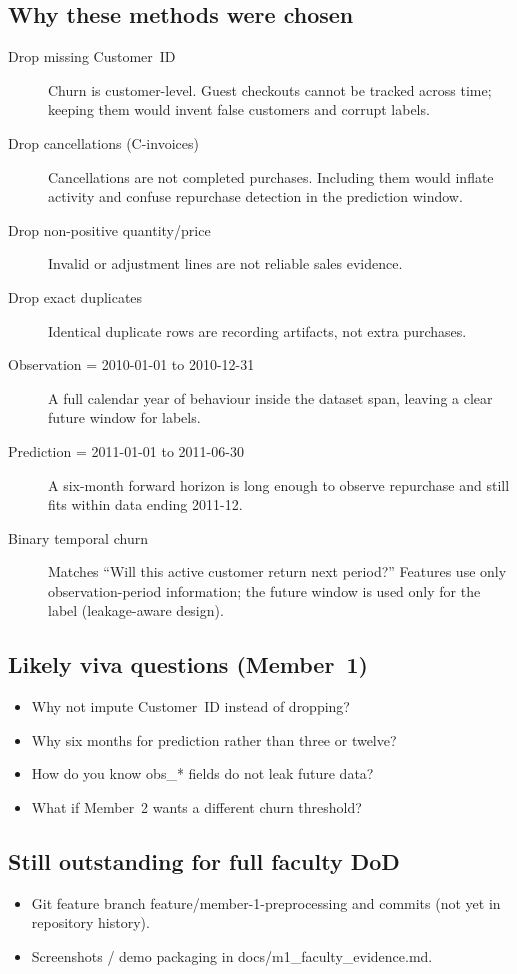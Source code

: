 \documentclass[11pt,a4paper]{article}
\renewcommand{\texttt}[1]{#1}
\begin{document}
\subsection{Why these methods were chosen}
\begin{description}
  \item[Drop missing Customer~ID]
        Churn is customer-level. Guest checkouts cannot be tracked across time;
        keeping them would invent false customers and corrupt labels.
  \item[Drop cancellations (\texttt{C}-invoices)]
        Cancellations are not completed purchases. Including them would inflate
        activity and confuse repurchase detection in the prediction window.
  \item[Drop non-positive quantity/price]
        Invalid or adjustment lines are not reliable sales evidence.
  \item[Drop exact duplicates]
        Identical duplicate rows are recording artifacts, not extra purchases.
  \item[Observation = 2010-01-01 to 2010-12-31]
        A full calendar year of behaviour inside the dataset span, leaving a
        clear future window for labels.
  \item[Prediction = 2011-01-01 to 2011-06-30]
        A six-month forward horizon is long enough to observe repurchase and
        still fits within data ending 2011-12.
  \item[Binary temporal churn]
        Matches ``Will this active customer return next period?'' Features use
        only observation-period information; the future window is used only for
        the label (leakage-aware design).
\end{description}

\subsection{Likely viva questions (Member~1)}
\begin{itemize}
  \item Why not impute Customer~ID instead of dropping?
  \item Why six months for prediction rather than three or twelve?
  \item How do you know \texttt{obs\_*} fields do not leak future data?
  \item What if Member~2 wants a different churn threshold?
\end{itemize}

\subsection{Still outstanding for full faculty DoD}
\begin{itemize}
  \item Git feature branch \texttt{feature/member-1-preprocessing} and commits
        (not yet in repository history).
  \item Screenshots / demo packaging in \texttt{docs/m1\_faculty\_evidence.md}.
\end{itemize}
\end{document}
